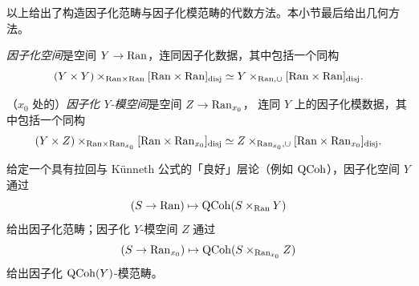 以上给出了构造因子化范畴与因子化模范畴的代数方法。本小节最后给出几何方法。

\begin{definition}
\label{def:fact-space}
\emph{因子化空间}是空间 $Y\to \mathrm{Ran}$，连同因子化数据，其中包括一个同构
\[
(Y\times Y)\times_{\mathrm{Ran}\times \mathrm{Ran}}[\mathrm{Ran}\times \mathrm{Ran}]_{\mathrm{disj}}
\simeq Y\times_{\mathrm{Ran},\cup}[\mathrm{Ran}\times \mathrm{Ran}]_{\mathrm{disj}}.
\]
\end{definition}

\begin{definition}
\label{def:fact-mod-space}
（$x_0$ 处的）\emph{因子化 $Y$-模空间}是空间 $Z\to \mathrm{Ran}_{x_0}$，
连同 $Y$ 上的因子化模数据，其中包括一个同构
\[
(Y\times Z)\times_{\mathrm{Ran}\times\mathrm{Ran}_{x_0}}[\mathrm{Ran}\times\mathrm{Ran}_{x_0}]_{\mathrm{disj}}
\simeq Z\times_{\mathrm{Ran}_{x_0},\cup}[\mathrm{Ran}\times\mathrm{Ran}_{x_0}]_{\mathrm{disj}}.
\]
\end{definition}

给定一个具有拉回与 Künneth 公式的「良好」层论（例如 $\mathrm{QCoh}$），因子化空间 $Y$
通过
\[
(S\to \mathrm{Ran})\mapsto \mathrm{QCoh}(S\times_{\mathrm{Ran}}Y)
\]
给出因子化范畴；因子化 $Y$-模空间 $Z$ 通过
\[
(S\to \mathrm{Ran}_{x_0})\mapsto \mathrm{QCoh}(S\times_{\mathrm{Ran}_{x_0}}Z)
\]
给出因子化 $\mathrm{QCoh}(Y)$-模范畴。

